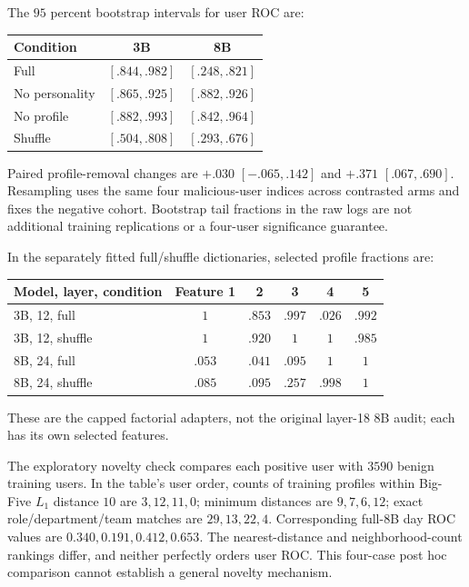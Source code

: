 The $95$ percent bootstrap intervals for user ROC are:
\begin{center}\small
\begin{tabular}{lcc}
\toprule
Condition & 3B & 8B \\
\midrule
Full & $[.844,.982]$ & $[.248,.821]$ \\
No personality & $[.865,.925]$ & $[.882,.926]$ \\
No profile & $[.882,.993]$ & $[.842,.964]$ \\
Shuffle & $[.504,.808]$ & $[.293,.676]$ \\
\bottomrule
\end{tabular}\end{center}
Paired profile-removal changes are $+.030$ $[-.065,.142]$ and
$+.371$ $[.067,.690]$. Resampling uses the same four malicious-user
indices across contrasted arms and fixes the negative cohort. Bootstrap
tail fractions in the raw logs are not additional training replications
or a four-user significance guarantee.

In the separately fitted full/shuffle dictionaries, selected profile
fractions are:
\begin{center}\small
\begin{tabular}{lccccc}
\toprule
Model, layer, condition & Feature 1 & 2 & 3 & 4 & 5 \\
\midrule
3B, 12, full & $1$ & $.853$ & $.997$ & $.026$ & $.992$ \\
3B, 12, shuffle & $1$ & $.920$ & $1$ & $1$ & $.985$ \\
8B, 24, full & $.053$ & $.041$ & $.095$ & $1$ & $1$ \\
8B, 24, shuffle & $.085$ & $.095$ & $.257$ & $.998$ & $1$ \\
\bottomrule
\end{tabular}\end{center}
These are the capped factorial adapters, not the original layer-18
8B audit; each has its own selected features.

The exploratory novelty check compares each positive user with $3590$
benign training users. In the table's user order, counts of training
profiles within Big-Five $L_1$ distance $10$ are $3,12,11,0$;
minimum distances are $9,7,6,12$; exact role/department/team matches
are $29,13,22,4$. Corresponding full-8B day ROC values are
$0.340,0.191,0.412,0.653$. The nearest-distance and neighborhood-count
rankings differ, and neither perfectly orders user ROC. This four-case
post hoc comparison cannot establish a general novelty mechanism.

